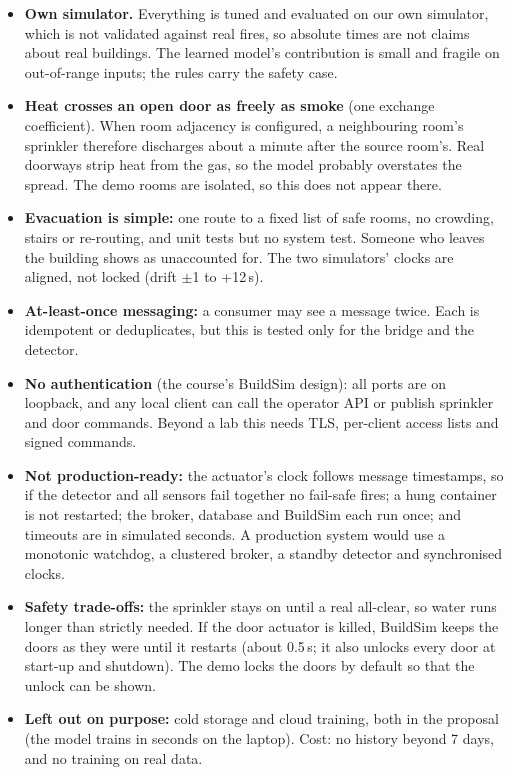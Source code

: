 \documentclass[11pt]{article}
\providecommand{\tightlist}{\setlength{\itemsep}{0pt}\setlength{\parskip}{0pt}}
\begin{document}
\begin{itemize}\tightlist
\item \textbf{Own simulator.} Everything is tuned and evaluated on our own simulator, which is not validated against real fires, so absolute times are not claims about real buildings. The learned model's contribution is small and fragile on out-of-range inputs; the rules carry the safety case.
\item \textbf{Heat crosses an open door as freely as smoke} (one exchange coefficient). When room adjacency is configured, a neighbouring room's sprinkler therefore discharges about a minute after the source room's. Real doorways strip heat from the gas, so the model probably overstates the spread. The demo rooms are isolated, so this does not appear there.
\item \textbf{Evacuation is simple:} one route to a fixed list of safe rooms, no crowding, stairs or re-routing, and unit tests but no system test. Someone who leaves the building shows as unaccounted for. The two simulators' clocks are aligned, not locked (drift $\pm$1 to +12\,s).
\item \textbf{At-least-once messaging:} a consumer may see a message twice. Each is idempotent or deduplicates, but this is tested only for the bridge and the detector.
\item \textbf{No authentication} (the course's BuildSim design): all ports are on loopback, and any local client can call the operator API or publish sprinkler and door commands. Beyond a lab this needs TLS, per-client access lists and signed commands.
\item \textbf{Not production-ready:} the actuator's clock follows message timestamps, so if the detector and all sensors fail together no fail-safe fires; a hung container is not restarted; the broker, database and BuildSim each run once; and timeouts are in simulated seconds. A production system would use a monotonic watchdog, a clustered broker, a standby detector and synchronised clocks.
\item \textbf{Safety trade-offs:} the sprinkler stays on until a real all-clear, so water runs longer than strictly needed. If the door actuator is killed, BuildSim keeps the doors as they were until it restarts (about 0.5\,s; it also unlocks every door at start-up and shutdown). The demo locks the doors by default so that the unlock can be shown.
\item \textbf{Left out on purpose:} cold storage and cloud training, both in the proposal (the model trains in seconds on the laptop). Cost: no history beyond 7 days, and no training on real data.
\end{itemize}
\end{document}
